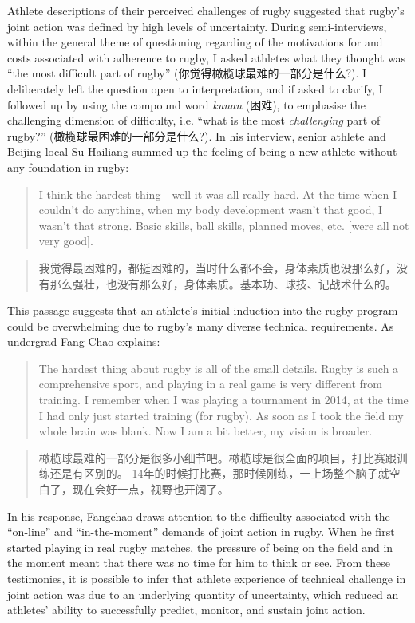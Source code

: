 \begin{CJK}{UTF8}{gbsn}
Athlete descriptions of their perceived challenges of rugby suggested that rugby's joint action was defined by high levels of uncertainty.
During semi-interviews, within the general theme of questioning regarding of the motivations for and costs associated with adherence to rugby, I asked athletes what they thought was ``the most difficult part of rugby'' (你觉得橄榄球最难的一部分是什么?).  I deliberately left the question open to interpretation, and if asked to clarify, I followed up by using the compound word \textit{kunan} (困难), to emphasise the challenging dimension of difficulty, i.e. ``what is the most \textit{challenging} part of rugby?'' (橄榄球最困难的一部分是什么?).  In his interview, senior athlete and Beijing local Su Hailiang summed up the feeling of being a new athlete without any foundation in rugby:

      \begin{quote}
          I think the hardest thing---well it was all really hard.  At the time when I couldn't do anything, when my body development wasn't that good, I wasn't that strong.  Basic skills, ball skills, planned moves, etc. [were all not very good].
      \end{quote}
      \begin{quote}
          我觉得最困难的，都挺困难的，当时什么都不会，身体素质也没那么好，没有那么强壮，也没有那么好，身体素质。基本功、球技、记战术什么的。
      \end{quote}

This passage suggests that an athlete's initial induction into the rugby program could be overwhelming due to rugby's many diverse technical requirements.  As undergrad Fang Chao explains:
          \begin{quote}
          The hardest thing about rugby is all of the small details. Rugby is such a comprehensive sport, and playing in a real game is very different from training. I remember when I was playing a tournament in 2014, at the time I had only just started training (for rugby).  As soon as I took the field my whole brain was blank.  Now I am a bit better, my vision is broader.
          \end{quote}

          \begin{quote}
          橄榄球最难的一部分是很多小细节吧。橄榄球是很全面的项目，打比赛跟训练还是有区别的。 14年的时候打比赛，那时候刚练，一上场整个脑子就空白了，现在会好一点，视野也开阔了。
          \end{quote}
In his response, Fangchao draws attention to the difficulty associated with the ``on-line'' and ``in-the-moment'' demands of joint action in rugby.  When he first started playing in real rugby matches, the pressure of being on the field and in the moment meant that there was no time for him to think or see.  From these testimonies, it is possible to infer that athlete experience of technical challenge in joint action was due to an underlying quantity of uncertainty, which reduced an athletes' ability to successfully predict, monitor, and sustain joint action.



\end{CJK}
